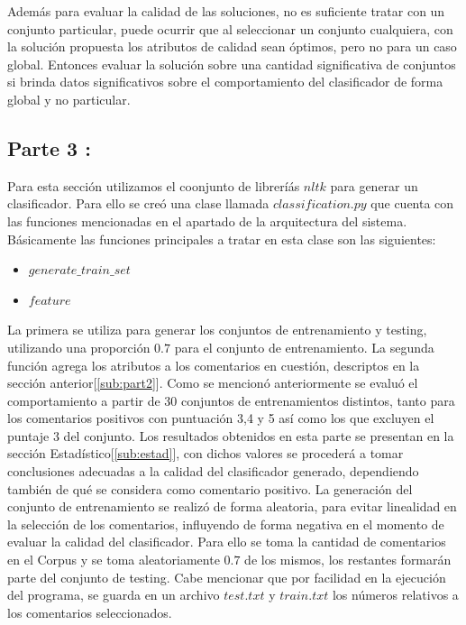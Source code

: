\documentclass[12pt]{article}
\begin{document}
Además para evaluar la calidad de las soluciones, no es suficiente tratar con un conjunto particular, puede ocurrir que al seleccionar un conjunto cualquiera, con la solución propuesta los atributos de calidad sean óptimos, pero no para un caso global. Entonces evaluar la solución sobre una cantidad significativa de conjuntos si brinda datos significativos sobre el comportamiento del clasificador de forma global y no particular.


\subsection{Parte 3 :}
Para esta sección utilizamos el coonjunto de libreríás $nltk$ para generar un clasificador. Para ello se creó una clase llamada $classification.py$ que cuenta con las funciones mencionadas en el apartado de la arquitectura del sistema. Básicamente las funciones principales a tratar en esta clase son las siguientes:
\begin{itemize}
  \item $generate\_train\_set$
  \item $feature$
\end{itemize}
La primera se utiliza para generar los conjuntos de entrenamiento y testing, utilizando una proporción $0.7$ para el conjunto de entrenamiento.
La segunda función agrega los atributos a los comentarios en cuestión, descriptos en la sección anterior[\ref{sub:part2}].
Como se mencionó anteriormente se evaluó el comportamiento a partir de 30 conjuntos de entrenamientos distintos, tanto para los comentarios positivos con puntuación 3,4 y 5 así como los que excluyen el puntaje 3 del conjunto.
Los resultados obtenidos en esta parte se presentan en la sección Estadístico[\ref{sub:estad}], con dichos valores se procederá a tomar conclusiones adecuadas a la calidad del clasificador generado, dependiendo también de qué se considera como comentario positivo.
La generación del conjunto de entrenamiento se realizó de forma aleatoria, para evitar linealidad en la selección de los comentarios, influyendo de forma negativa en el momento de evaluar la calidad del clasificador. Para ello se toma la cantidad de comentarios en el Corpus y se toma aleatoriamente $0.7$ de los mismos, los restantes formarán parte del conjunto de testing. Cabe mencionar que por facilidad en la ejecución del programa, se guarda en un archivo $test.txt$ y $train.txt$ los números relativos a los comentarios seleccionados.

\end{document}
